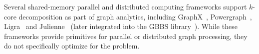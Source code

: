 {Several shared-memory parallel and distributed computing frameworks support $k$-core decomposition as part of graph analytics,
including GraphX~\cite{gonzalez2014graphx}, Powergraph~\cite{gonzalez2012powergraph}, Ligra~\cite{shun2013ligra} and Julienne~\cite{dhulipala2017} (later integrated into the GBBS library~\cite{gbbs2021}).
While these frameworks provide primitives for parallel or distributed graph processing, 
they do not specifically optimize for the \kcore{} problem.
}